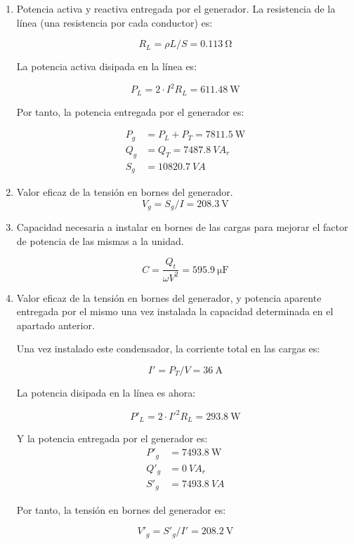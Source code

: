 \documentclass[12pt]{article}
\begin{document}
\begin{enumerate}
\item Potencia activa y reactiva entregada por el generador.
La resistencia de la línea (una resistencia por cada conductor) es:

\[
R_L = \rho L/S = \SI{0.113}{\ohm}
\]

La potencia activa disipada en la línea es:

\[
P_L = 2 \cdot I^2 R_L = \SI{611.48}{\watt}
\]

Por tanto, la potencia entregada por el generador es:

\begin{align*}
P_g &= P_L + P_T = \SI{7811.5}{\watt}\\
Q_g &= Q_T = \SI{7487.8}{VA}_r\\
S_g &= \SI{10820.7}{VA}
\end{align*}

\item Valor eficaz de la tensión en bornes del generador.
\[
V_g = S_g / I = \SI{208.3}{\volt}
\]

\item Capacidad necesaria a instalar en bornes de las cargas para
  mejorar el factor de potencia de las mismas a la unidad.

  \[
C = \frac{Q_t}{\omega V^2} = \SI{595.9}{\micro\farad}
\]


\item Valor eficaz de la tensión en bornes del generador, y potencia
  aparente entregada por el mismo una vez instalada la capacidad
  determinada en el apartado anterior.

  Una vez instalado este condensador, la corriente total en las cargas es:

\[
I' = P_T / V = \SI{36}{\ampere}
\]

La potencia disipada en la línea es ahora:

\[
P'_L = 2 \cdot I'^2 R_L = \SI{293.8}{\watt} 
\]

Y la potencia entregada por el generador es:
\begin{align*}
P'_g &= \SI{7493.8}{\watt}\\
Q'_g &= \SI{0}{VA}_r\\
S'_g &= \SI{7493.8}{VA}
\end{align*}

Por tanto, la tensión en bornes del generador es:

\[
V'_g = S'_g / I' = \SI{208.2}{\volt}
\]

\end{enumerate}
\end{document}
